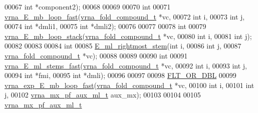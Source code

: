 \begin{DoxyCode}
00067                 \textcolor{keywordtype}{int}                   *component2);
00068 
00069 
00070 \textcolor{keywordtype}{int}
00071 \mbox{\hyperlink{group__loops_gace56cf9c68e22ebfbeb4c04add4b03ca}{vrna\_E\_mb\_loop\_fast}}(\mbox{\hyperlink{group__fold__compound_structvrna__fc__s}{vrna\_fold\_compound\_t}}  *vc,
00072                     \textcolor{keywordtype}{int}                   i,
00073                     \textcolor{keywordtype}{int}                   j,
00074                     \textcolor{keywordtype}{int}                   *dmli1,
00075                     \textcolor{keywordtype}{int}                   *dmli2);
00076 
00077 
00078 \textcolor{keywordtype}{int}
00079 \mbox{\hyperlink{group__loops_ga73f048d35475e1d8f50b7d4ac6a2aeb6}{vrna\_E\_mb\_loop\_stack}}(\mbox{\hyperlink{group__fold__compound_structvrna__fc__s}{vrna\_fold\_compound\_t}} *vc,
00080                      \textcolor{keywordtype}{int}                  i,
00081                      \textcolor{keywordtype}{int}                  j);
00082 
00083 
00084 \textcolor{keywordtype}{int}
00085 \mbox{\hyperlink{group__loops_gabe85e055e1e3245eaf108901473114ed}{E\_ml\_rightmost\_stem}}(\textcolor{keywordtype}{int}                   i,
00086                     \textcolor{keywordtype}{int}                   j,
00087                     \mbox{\hyperlink{group__fold__compound_structvrna__fc__s}{vrna\_fold\_compound\_t}}  *vc);
00088 
00089 
00090 \textcolor{keywordtype}{int}
00091 \mbox{\hyperlink{group__loops_ga806a455bf00a155dea7b0aa93d85c51b}{vrna\_E\_ml\_stems\_fast}}(\mbox{\hyperlink{group__fold__compound_structvrna__fc__s}{vrna\_fold\_compound\_t}} *vc,
00092                      \textcolor{keywordtype}{int}                  i,
00093                      \textcolor{keywordtype}{int}                  j,
00094                      \textcolor{keywordtype}{int}                  *fmi,
00095                      \textcolor{keywordtype}{int}                  *dmli);
00096 
00097 
00098 \mbox{\hyperlink{group__data__structures_ga31125aeace516926bf7f251f759b6126}{FLT\_OR\_DBL}}
00099 \mbox{\hyperlink{group__loops_ga604313896e5f0ec91b6c44460707d036}{vrna\_exp\_E\_mb\_loop\_fast}}(\mbox{\hyperlink{group__fold__compound_structvrna__fc__s}{vrna\_fold\_compound\_t}}  *vc,
00100                         \textcolor{keywordtype}{int}                   i,
00101                         \textcolor{keywordtype}{int}                   j,
00102                         \mbox{\hyperlink{group__loops_ga39a8cc1385dcb542a60a9393cde6a1e3}{vrna\_mx\_pf\_aux\_ml\_t}}   aux\_mx);
00103 
00104 
00105 \mbox{\hyperlink{group__loops_ga39a8cc1385dcb542a60a9393cde6a1e3}{vrna\_mx\_pf\_aux\_ml\_t}}

\end{DoxyCode}
